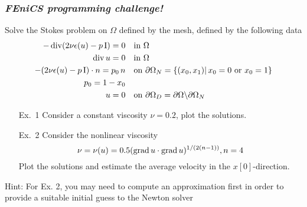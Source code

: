\begin{frame}
  \frametitle{\emph{FEniCS programming challenge!}}
  \bigskip

  Solve the Stokes problem on $\Omega$ defined by the  mesh,
  defined by the following data
  \begin{equation*}
    \begin{split}
      - \operatorname{\mathrm{div}} (2\nu \epsilon(u) - p \, \mathrm{I}) = 0 \quad &\text{in } \Omega \\
      \operatorname{\mathrm{div}} u = 0 \quad &\text{in } \Omega \\
      - (2\nu \epsilon(u) - p \, \mathrm{I}) \cdot n = p_0 \, n
      \quad &\text{on } \partial \Omega_N = \{(x_0, x_1) | \, x_0 = 0 \text{ or } x_0 = 1\} \\
      p_0 = 1 - x_0 \quad & \\
      u = 0 \quad & \text{on } \partial \Omega_D = \partial \Omega \backslash \partial \Omega_N
    \end{split}
  \end{equation*}

  \begin{enumerate}
  \item[Ex.~1] Consider a constant viscosity $\nu = 0.2$, plot the
    solutions.
  \item[Ex.~2] Consider the nonlinear viscosity
    \begin{equation*}
      \nu = \nu(u) = 0.5 (\operatorname{\mathrm{grad}} u \cdot \operatorname{\mathrm{grad}} u)^{1/(2 (n-1))}, n = 4
    \end{equation*}
    Plot the solutions and estimate the \alert{average velocity} in
    the $x[0]$-direction.
  \end{enumerate}

  {\tiny \alert{Hint}: For Ex. 2, you may need to compute an approximation
    first in order to provide a suitable initial guess to the Newton
    solver}

\end{frame}
